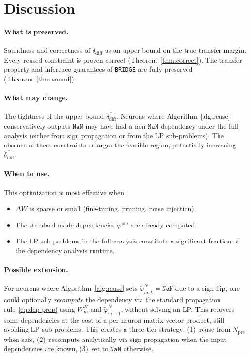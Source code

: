 \documentclass[11pt]{article}
\theoremstyle{definition}
\newcommand{\tool}{\texttt{BRIDGE}\xspace}
\newcommand{\dD}{\delta_{\mathrm{diff}}}
\newcommand{\Npre}{N_{\mathrm{pre}}}
\begin{document}
\section{Discussion}
\label{sec:discussion}

\paragraph{What is preserved.}
Soundness and correctness of $\dD$ as an upper bound on the true transfer margin. Every reused constraint is proven correct (Theorem~\ref{thm:correct}). The transfer property and inference guarantees of \tool are fully preserved (Theorem~\ref{thm:sound}).

\paragraph{What may change.}
The tightness of the upper bound $\hat{\dD}$. Neurons where Algorithm~\ref{alg:reuse} conservatively outputs $\mathtt{NaN}$ may have had a non-$\mathtt{NaN}$ dependency under the full analysis (either from sign propagation or from the LP sub-problems). The absence of these constraints enlarges the feasible region, potentially increasing $\hat{\dD}$.

\paragraph{When to use.}
This optimization is most effective when:
\begin{itemize}
  \item $\Delta W$ is sparse or small (fine-tuning, pruning, noise injection),
  \item The standard-mode dependencies $\varphi^{\mathrm{pre}}$ are already computed,
  \item The LP sub-problems in the full analysis constitute a significant fraction of the dependency analysis runtime.
\end{itemize}

\paragraph{Possible extension.}
For neurons where Algorithm~\ref{alg:reuse} sets $\tilde{\varphi}_{m,k}^{N} = \mathtt{NaN}$ due to a sign flip, one could optionally \emph{recompute} the dependency via the standard propagation rule~\eqref{eq:dep-prop} using $W_m^{N}$ and $\tilde{\varphi}_{m-1}^{N}$, without solving an LP. This recovers some dependencies at the cost of a per-neuron matrix-vector product, still avoiding LP sub-problems. This creates a three-tier strategy: (1)~reuse from $\Npre$ when safe, (2)~recompute analytically via sign propagation when the input dependencies are known, (3)~set to $\mathtt{NaN}$ otherwise.
\end{document}
